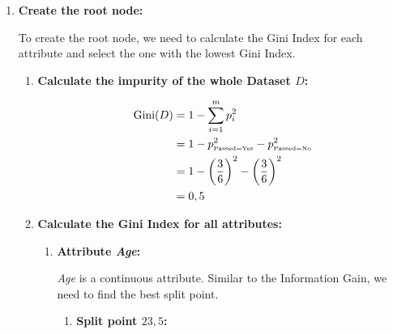 \documentclass[
english,
smallborders
]{i6prcsht}
\newcommand{\OfSpecificValue}[3]{_{\text{\tiny #1#2#3}}}
\begin{document}
\begin{solution}
	\begin{enumerate}
		\item \textbf{Create the root node:}
		      
		      To create the root node, we need to calculate the Gini Index for each attribute and select the one with the lowest Gini Index.
		      
		      \begin{enumerate}
			      \item \textbf{Calculate the impurity of the whole Dataset $D$:}
			            
			            \begin{alignat*}{2}
				            \text{Gini}(D) & = 1 - \sum_{i=1}^{m}p_i^2                                                      \\
				                           & = 1 - p\OfSpecificValue{Passed}{=}{Yes}^2 - p\OfSpecificValue{Passed}{=}{No}^2 \\
				                           & = 1 - \left(\frac{3}{6}\right)^2 - \left(\frac{3}{6}\right)^2                  \\
				                           & = 0,5                                                                          \\
			            \end{alignat*}
			            
			      \item \textbf{Calculate the Gini Index for all attributes:}
			            
			            \begin{enumerate}
				            \item \textbf{Attribute \textit{Age}:}
				                  
				                  \textit{Age} is a continuous attribute. Similar to the Information Gain, we need to find the best split point.
				                  
				                  \begin{enumerate}
					                  \item \textbf{Split point $23,5$:}
					                        

\end{enumerate}
\end{enumerate}
\end{enumerate}
\end{enumerate}
\end{solution}
\end{document}
